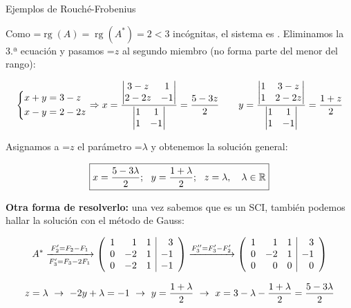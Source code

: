 \documentclass[11pt,a4paper]{article}
\newcommand{\fmm}[1]{\setbox0=\hbox{$#1$}\ifdim\wd0>\linewidth\fmdisp{#1}\else\mbox{\box0}\fi}
\newcommand{\fmdisp}[1]{\[\setbox2=\hbox{$\displaystyle #1$}\ifdim\wd2>\linewidth\resizebox{\linewidth}{!}{\box2}\else\box2\fi\]}
\newcommand{\fmbadge}[2]{\tcbox[on line,colback=#1,colframe=#1,arc=2mm,boxsep=0pt,left=4pt,right=4pt,top=1.5pt,bottom=1.5pt]{\color{white}\footnotesize\bfseries #2}}
\begin{document}
\begin{fmex}{Ejemplos de Rouché-Frobenius}
\begin{enumerate}[label=\textbf{\arabic*.},leftmargin=*]
Como \fmm{\operatorname{rg}(A)=\operatorname{rg}(A^*)=2<3} incógnitas, el sistema es \fmbadge{fmev}{SCI}. Eliminamos la 3.ª ecuación y pasamos \fmm{z} al segundo miembro (no forma parte del menor del rango):

\fmdisp{\left\{\begin{aligned}x+y&=3-z\\ x-y&=2-2z\end{aligned}\right.\Rightarrow x=\frac{\begin{vmatrix}3-z & 1\\ 2-2z & -1\end{vmatrix}}{\begin{vmatrix}1 & 1\\ 1 & -1\end{vmatrix}}=\frac{5-3z}{2}\qquad y=\frac{\begin{vmatrix}1 & 3-z\\ 1 & 2-2z\end{vmatrix}}{\begin{vmatrix}1 & 1\\ 1 & -1\end{vmatrix}}=\frac{1+z}{2}}

Asignamos a \fmm{z} el parámetro \fmm{\lambda} y obtenemos la solución general:

\fmdisp{\boxed{x=\frac{5-3\lambda}{2};\ \ y=\frac{1+\lambda}{2};\ \ z=\lambda,\quad\lambda\in\mathbb{R}}}

\textbf{Otra forma de resolverlo:} una vez sabemos que es un SCI, también podemos hallar la solución con el método de Gauss:

\fmdisp{A^*\xrightarrow[F_3'=F_3-2F_1]{F_2'=F_2-F_1}\left(\begin{array}{rrr|r}1 & 1 & 1 & 3\\ 0 & -2 & 1 & -1\\ 0 & -2 & 1 & -1\end{array}\right)\xrightarrow{F_3''=F_3'-F_2'}\left(\begin{array}{rrr|r}1 & 1 & 1 & 3\\ 0 & -2 & 1 & -1\\ 0 & 0 & 0 & 0\end{array}\right)}

\fmdisp{z=\lambda\ \rightarrow\ -2y+\lambda=-1\ \rightarrow\ y=\frac{1+\lambda}{2}\ \rightarrow\ x=3-\lambda-\frac{1+\lambda}{2}=\frac{5-3\lambda}{2}}

\end{enumerate}
\end{fmex}
\end{document}
